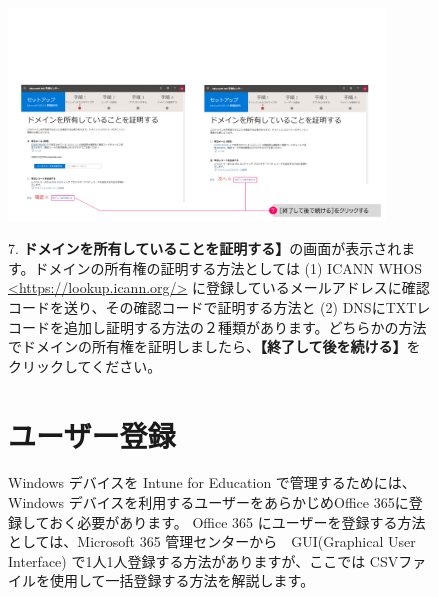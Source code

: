 \begin{figure}[htbp]
    \begin{minipage}{0.6\textwidth}
        \vspace{-1.5cm}\hspace{-0.5cm}
        \includegraphics[width=10cm]{figures/M365_setting1-05.png}
    \end{minipage}
    \begin{minipage}{0.4\textwidth}
        7. \textbf{ドメインを所有していることを証明する】}の画面が表示されます。ドメインの所有権の証明する方法としては (1) ICANN WHOS \url{<https://lookup.icann.org/>} に登録しているメールアドレスに確認コードを送り、その確認コードで証明する方法と (2) DNSにTXTレコードを追加し証明する方法の２種類があります。どちらかの方法でドメインの所有権を証明しましたら、\textbf{【終了して後を続ける】}をクリックしてください。
    \end{minipage}
\end{figure}



\begin{figure}[htbp]
    \section{ユーザー登録}
    \label{sec:ユーザー登録}

    \hspace{8pt} Windows デバイスを Intune for Education で管理するためには、Windows デバイスを利用するユーザーをあらかじめOffice 365に登録しておく必要があります。
    Office 365 にユーザーを登録する方法としては、Microsoft 365 管理センターから　GUI(Graphical User Interface) で1人1人登録する方法がありますが、ここでは CSVファイルを使用して一括登録する方法を解説します。\\
\end{figure}




